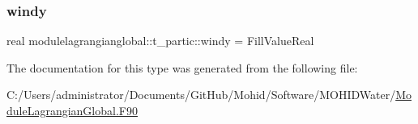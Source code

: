 \subsubsection{\texorpdfstring{windy}{windy}}
{\footnotesize\ttfamily real modulelagrangianglobal\+::t\+\_\+partic\+::windy = Fill\+Value\+Real\hspace{0.3cm}{\ttfamily [private]}}



The documentation for this type was generated from the following file\+:\begin{DoxyCompactItemize}
\item 
C\+:/\+Users/administrator/\+Documents/\+Git\+Hub/\+Mohid/\+Software/\+M\+O\+H\+I\+D\+Water/\mbox{\hyperlink{_module_lagrangian_global_8_f90}{Module\+Lagrangian\+Global.\+F90}}\end{DoxyCompactItemize}
